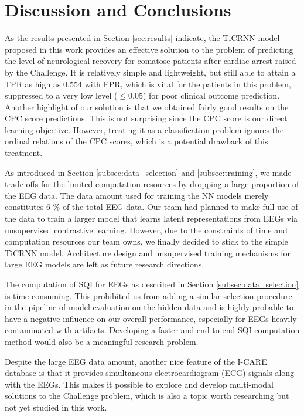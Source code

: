 \section{Discussion and Conclusions}
\label{sec:discu}


As the results presented in Section \ref{sec:results} indicate, the TiCRNN model proposed in this work provides an effective solution to the problem of predicting the level of neurological recovery for comatose patients after cardiac arrest raised by the Challenge. It is relatively simple and lightweight, but still able to attain a TPR as high as 0.554 with FPR, which is vital for the patients in this problem, suppressed to a very low level ($\le 0.05$) for poor clinical outcome prediction. Another highlight of our solution is that we obtained fairly good results on the CPC score predictions. This is not surprising since the CPC score is our direct learning objective. However, treating it as a classification problem ignores the ordinal relations of the CPC scores, which is a potential drawback of this treatment.

As introduced in Section \ref{subsec:data_selection} and \ref{subsec:training}, we made trade-offs for the limited computation resources by dropping a large proportion of the EEG data. The data amount used for training the NN models merely constitutes 6 \% of the total EEG data. Our team had planned to make full use of the data to train a larger model that learns latent representations from EEGs via unsupervised contrastive learning. However, due to the constraints of time and computation resources our team owns, we finally decided to stick to the simple TiCRNN model. Architecture design and unsupervised training mechanisms for large EEG models are left as future research directions.

The computation of SQI for EEGs as described in Section \ref{subsec:data_selection} is time-consuming. This prohibited us from adding a similar selection procedure in the pipeline of model evaluation on the hidden data and is highly probable to have a negative influence on our overall performance, especially for EEGs heavily contaminated with artifacts. Developing a faster and end-to-end SQI computation method would also be a meaningful research problem.

Despite the large EEG data amount, another nice feature of the I-CARE database is that it provides simultaneous electrocardiogram (ECG) signals along with the EEGs. This makes it possible to explore and develop multi-modal solutions to the Challenge problem, which is also a topic worth researching but not yet studied in this work.
